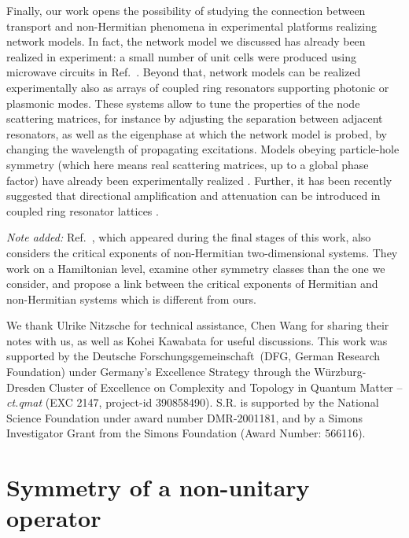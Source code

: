 \documentclass[aps,pra,reprint,superscriptaddress,showkeys,amsmath,amssymb,longbibliography]{revtex4-1}
\begin{document}
Finally, our work opens the possibility of studying the connection between transport and non-Hermitian phenomena in experimental platforms realizing network models.
In fact, the network model we discussed has already been realized in experiment: a small number of unit cells were produced using microwave circuits in Ref.~\cite{Hwsc_model}.
Beyond that, network models can be realized experimentally also as arrays of coupled ring resonators supporting photonic \cite{Hafezi2011, Afzal2020} or plasmonic \cite{Gao2016, Gao2018} modes. 
These systems allow to tune the properties of the node scattering matrices, for instance by adjusting the separation between adjacent resonators, as well as the eigenphase at which the network model is probed, by changing the wavelength of propagating excitations.
Models obeying particle-hole symmetry (which here means real scattering matrices, up to a global phase factor) have already been experimentally realized \cite{Gao2016, Afzal2020}. 
Further, it has been recently suggested that directional amplification and attenuation can be introduced in coupled ring resonator lattices \cite{Zhu2020, Song2020}.

\emph{Note added:} Ref.~\cite{Luoxunlong2021}, which appeared during the final stages of this work, also considers the critical exponents of non-Hermitian two-dimensional systems. 
They work on a Hamiltonian level, examine other symmetry classes than the one we consider, and propose a link between the critical exponents of Hermitian and non-Hermitian systems which is different from ours.

\begin{acknowledgments}
We thank Ulrike Nitzsche for technical assistance, Chen Wang for sharing their notes with us, as well as Kohei Kawabata for useful discussions.
This work was supported by the Deutsche Forschungsgemeinschaft~(DFG, German
Research Foundation) under Germany's Excellence Strategy through the
W\"{u}rzburg-Dresden Cluster of Excellence on Complexity and Topology in Quantum
Matter -- \emph{ct.qmat} (EXC 2147, project-id 390858490).
S.R. is supported
by the National Science Foundation under award number DMR-2001181, and by a Simons Investigator Grant
from the Simons Foundation (Award Number: 566116).
\end{acknowledgments}

\appendix
\section{Symmetry of a non-unitary operator}
\label{app:sym_eo}
\end{document}
